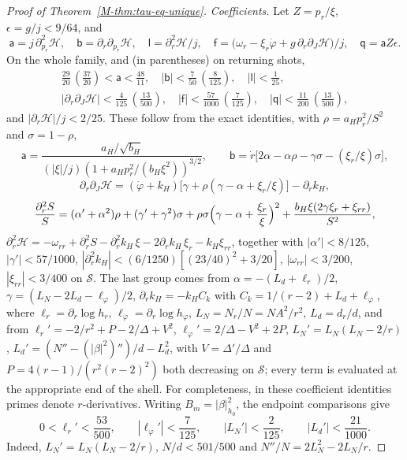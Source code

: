 \documentclass[aip,jmp,amsmath,amssymb,reprint]{revtex4-2}
\theoremstyle{plain}
\theoremstyle{definition}
\begin{document}
\begin{proof}[Proof of Theorem~\ref{M-thm:tau-eq-unique}]
\emph{Coefficients.} Let $Z=p_r/\xi$, $\epsilon=g/j<9/64$, and
\[
  \mathsf a=j\,\partial^2_{p_r}\mathcal H,\quad \mathsf b=\partial_r\partial_{p_r}\mathcal H,\quad
  \mathsf l=\partial_r^2\mathcal H/j,\quad
  \mathsf f=\bigl(\omega_r-\xi_r\dot\varphi+g\,\partial_r\partial_J\mathcal H\bigr)/j,\quad \mathsf q=\mathsf a Z\epsilon .
\]
On the whole family, and (in parentheses) on returning shots,
\[
  \begin{array}{l}
  \tfrac{29}{20}\,(\tfrac{37}{20})<\mathsf a<\tfrac{48}{11},\quad |\mathsf b|<\tfrac7{50}\,(\tfrac8{125}),\quad
  |\mathsf l|<\tfrac1{25},\\[2pt]
  |\partial_r\partial_J\mathcal H|<\tfrac4{125}\,(\tfrac{13}{500}),\quad
  |\mathsf f|<\tfrac{57}{1000}\,(\tfrac7{125}),\quad |\mathsf q|<\tfrac{11}{200}\,(\tfrac{13}{500}),
  \end{array}
\]
and $|\partial_r\mathcal H|/j<2/25$. These follow from the exact identities, with
$\rho=a_Hp_r^2/S^2$ and $\sigma=1-\rho$,
\[
  \mathsf a=\frac{a_H/\sqrt{b_H}}{(|\xi|/j)(1+a_Hp_r^2/(b_H\xi^2))^{3/2}},\qquad
  \mathsf b=\dot r\bigl[2\alpha-\alpha\rho-\gamma\sigma-(\xi_r/\xi)\sigma\bigr],
\]
\[
  \partial_r\partial_J\mathcal H=(\dot\varphi+k_H)\bigl[\gamma+\rho(\gamma-\alpha+\xi_r/\xi)\bigr]-\partial_rk_H,
\]
\[
  \frac{\partial_r^2S}{S}=(\alpha'+\alpha^2)\rho+(\gamma'+\gamma^2)\sigma+\rho\sigma\Bigl(\gamma-\alpha+\frac{\xi_r}\xi\Bigr)^2
  +\frac{b_H\xi(2\gamma\xi_r+\xi_{rr})}{S^2},
\]
$\partial_r^2\mathcal H=-\omega_{rr}+\partial_r^2S-\partial_r^2k_H\,\xi-2\partial_rk_H\,\xi_r-k_H\xi_{rr}$, together with
$|\alpha'|<8/125$, $|\gamma'|<57/1000$, $|\partial_r^2k_H|<(6/1250)[(23/40)^2+3/20]$, $|\omega_{rr}|<3/200$,
$|\xi_{rr}|<3/400$ on $\mathcal S$. The last group comes from $\alpha=-(L_d+\ell_r)/2$,
$\gamma=(L_N-2L_d-\ell_\varphi)/2$, $\partial_rk_H=-k_HC_k$ with $C_k=1/(r-2)+L_d+\ell_\varphi$, where
$\ell_r=\partial_r\log h_r$, $\ell_\varphi=\partial_r\log h_\varphi$, $L_N=N_r/N=NA^2/r^2$, $L_d=d_r/d$, and from
$\ell_r'=-2/r^2+P-2/\Delta+V^2$, $\ell_\varphi'=2/\Delta-V^2+2P$, $L_N'=L_N(L_N-2/r)$,
$L_d'=(N''-(|\beta|^2)'')/d-L_d^2$, with $V=\Delta'/\Delta$ and $P=4(r-1)/(r^2(r-2)^2)$ both decreasing on
$\mathcal S$; every term is evaluated at the appropriate end of the shell.
For completeness, in these coefficient identities primes denote $r$-derivatives.
Writing $B_m=|\beta|^2_{h_0}$, the endpoint comparisons give
\[
 0<\ell_r'<\frac{53}{500},\qquad |\ell_\varphi'|<\frac7{125},\qquad
 |L_N'|<\frac2{125},\qquad |L_d'|<\frac{21}{1000}.
\]
Indeed, $L_N'=L_N(L_N-2/r)$, $N/d<501/500$ and
$N''/N=2L_N^2-2L_N/r$.

\end{proof}
\end{document}
